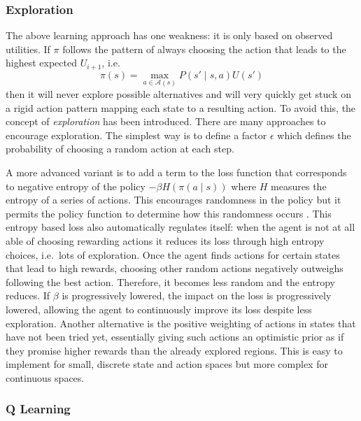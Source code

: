 \subsubsection{Exploration}%
\label{sub:exploration}

The above learning approach has one weakness: it is only based on observed utilities. If $\pi$ follows the pattern of
always choosing the action that leads to the highest expected $U_{i+1}$, i.e.\
\begin{equation}
    \pi(s) = \max_{a \in \mathcal{A}(s)}P(s' \mid s, a)U(s')
\end{equation}
then it will never explore possible alternatives and will very quickly get stuck on a rigid action
pattern mapping each state to a resulting action. To avoid this, the concept of \emph{exploration} has been introduced.
There are many approaches to encourage exploration. The simplest way is to define a factor $\epsilon$ which defines the
probability of choosing a random action at each step.

A more advanced variant is to add a term to the loss function that corresponds to negative entropy of the policy $-\beta
H(\pi(a \mid s ))$ where $H$ measures the entropy of a series of actions. This encourages randomness in the policy but
it permits the policy function to determine how this randomness occurs \citep{schmitt2018kickstarting}. This
entropy based loss also automatically regulates itself: when the agent is not at all able of choosing rewarding actions
it reduces its loss through high entropy choices, i.e.\ lots of exploration. Once the agent finds actions for certain
states that lead to high rewards, choosing other random actions negatively outweighs following the best action.
Therefore, it becomes less random and the entropy reduces. If $\beta$ is progressively lowered, the impact on the loss
is progressively lowered, allowing the agent to continuously improve its loss despite less exploration.
Another alternative is the positive weighting of actions in states that have not been tried yet, essentially giving such
actions an optimistic prior as if they promise higher rewards than the already explored regions. This is easy to
implement for small, discrete state and action spaces but more complex for continuous spaces.



\subsubsection{Q Learning}%
\label{sub:q_learning}

